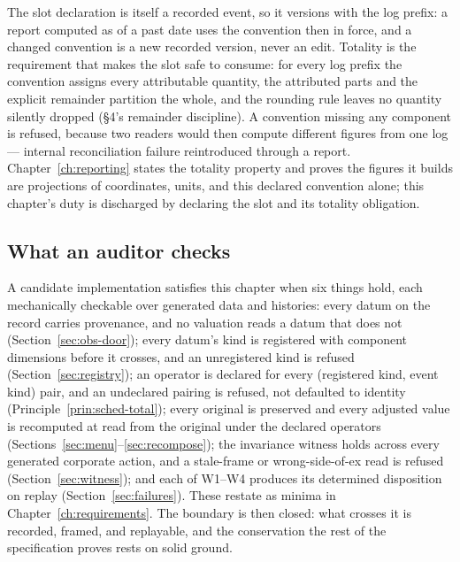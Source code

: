 The slot declaration is itself a recorded event, so it versions with the log prefix: a
report computed as of a past date uses the convention then in force, and a changed
convention is a new recorded version, never an edit. Totality is the requirement that makes
the slot safe to consume: for every log prefix the convention assigns every attributable
quantity, the attributed parts and the explicit remainder partition the whole, and the
rounding rule leaves no quantity silently dropped (\S 4's remainder discipline). A
convention missing any component is refused, because two readers would then compute
different figures from one log --- internal reconciliation failure reintroduced through a
report. Chapter~\ref{ch:reporting} states the totality property and proves the figures it
builds are projections of coordinates, units, and this declared convention alone; this
chapter's duty is discharged by declaring the slot and its totality obligation.

\subsection{What an auditor checks}

A candidate implementation satisfies this chapter when six things hold, each mechanically
checkable over generated data and histories: every datum on the record carries provenance,
and no valuation reads a datum that does not (Section~\ref{sec:obs-door}); every datum's
kind is registered with component dimensions before it crosses, and an unregistered kind is
refused (Section~\ref{sec:registry}); an operator is declared for every (registered kind,
event kind) pair, and an undeclared pairing is refused, not defaulted to identity
(Principle~\ref{prin:sched-total}); every original is preserved and every adjusted value is
recomputed at read from the original under the declared operators
(Sections~\ref{sec:menu}--\ref{sec:recompose}); the invariance witness holds across every
generated corporate action, and a stale-frame or wrong-side-of-ex read is refused
(Section~\ref{sec:witness}); and each of W1--W4 produces its determined disposition on
replay (Section~\ref{sec:failures}). These restate as minima in
Chapter~\ref{ch:requirements}. The boundary is then closed: what crosses it is recorded,
framed, and replayable, and the conservation the rest of the specification proves rests on
solid ground.
